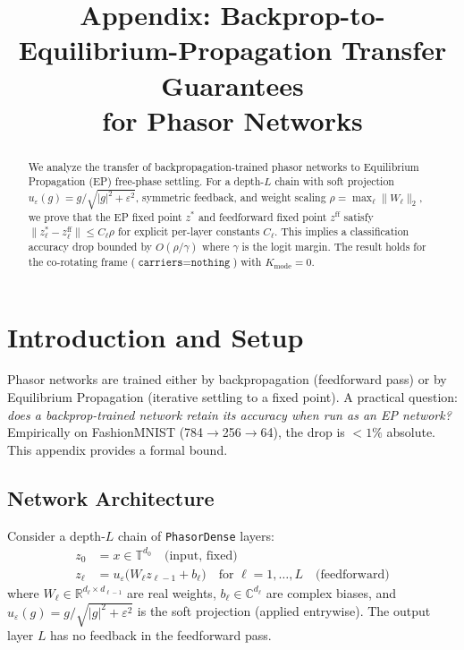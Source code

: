 \documentclass[11pt]{article}
\title{Appendix: Backprop-to-Equilibrium-Propagation Transfer Guarantees\\for Phasor Networks}
\author{}
\date{}
\newcommand{\R}{\mathbb{R}}
\newcommand{\C}{\mathbb{C}}
\newcommand{\T}{\mathbb{T}}
\begin{document}
\maketitle

\begin{abstract}
We analyze the transfer of backpropagation-trained phasor networks to
Equilibrium Propagation (EP) free-phase settling. For a depth-$L$ chain
with soft projection $u_\varepsilon(g) = g/\sqrt{|g|^2+\varepsilon^2}$,
symmetric feedback, and weight scaling $\rho = \max_\ell \|W_\ell\|_2$,
we prove that the EP fixed point $z^*$ and feedforward fixed point
$z^{\text{ff}}$ satisfy $\|z^*_\ell - z^{\text{ff}}_\ell\| \le C_\ell \rho$
for explicit per-layer constants $C_\ell$. This implies a classification
accuracy drop bounded by $O(\rho/\gamma)$ where $\gamma$ is the
logit margin. The result holds for the co-rotating frame
($\texttt{carriers}=\texttt{nothing}$) with $K_\text{mode}=0$.
\end{abstract}

\section{Introduction and Setup}

Phasor networks \citep{olin2021deep,olin2023hyperdimensional} are
trained either by backpropagation (feedforward pass) or by
Equilibrium Propagation (iterative settling to a fixed point). A
practical question: \emph{does a backprop-trained network retain its
accuracy when run as an EP network?} Empirically on FashionMNIST
(784$\to$256$\to$64), the drop is $<1\%$ absolute. This appendix
provides a formal bound.

\subsection{Network Architecture}
Consider a depth-$L$ chain of \texttt{PhasorDense} layers:
\begin{align}
  z_0 &= x \in \T^{d_0} \quad\text{(input, fixed)}\\
  z_\ell &= u_\varepsilon\big(W_\ell z_{\ell-1} + b_\ell\big)
  \quad\text{for } \ell=1,\dots,L \quad\text{(feedforward)}
\end{align}
where $W_\ell \in \R^{d_\ell \times d_{\ell-1}}$ are real weights,
$b_\ell \in \C^{d_\ell}$ are complex biases, and
$u_\varepsilon(g) = g/\sqrt{|g|^2+\varepsilon^2}$ is the soft projection
(applied entrywise). The output layer $L$ has no feedback in the
feedforward pass.
\end{document}

